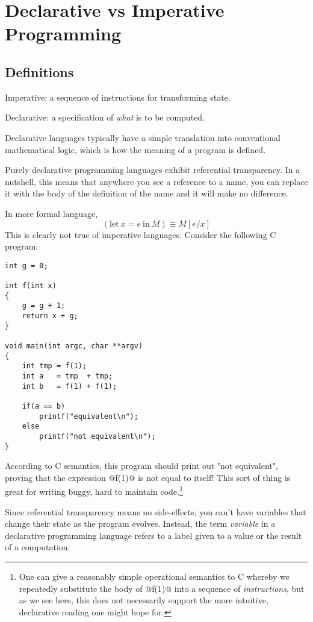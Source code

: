 \section{Declarative vs Imperative Programming}

\subsection{Definitions}

\begin{description}
\item{Imperative:} a sequence of instructions for transforming state.
\item{Declarative:} a specification of \emph{what} is to be computed.
\end{description}

Declarative languages typically have a simple translation into
conventional mathematical logic, which is how the meaning of a program
is defined.

Purely declarative programming languages exhibit referential
transparency.  In a nutshell, this means that anywhere you see a
reference to a name, you can replace it with the body of the
definition of the name and it will make no difference.

In more formal language,
\[
(\text{let}\ x = e\ \text{in}\ M)  \equiv  M[e/x]
\]
This is clearly not true of imperative languages.  Consider
the following C program:

\begin{verbatim}
int g = 0;

int f(int x)
{
    g = g + 1;
    return x + g;
}

void main(int argc, char **argv)
{
    int tmp = f(1);
    int a   = tmp  + tmp;
    int b   = f(1) + f(1);

    if(a == b)
        printf("equivalent\n");
    else
        printf("not equivalent\n");
}
\end{verbatim}

According to C semantics, this program should print out "not
equivalent", proving that the expression @f(1)@ is not equal to
itself!  This sort of thing is great for writing buggy, hard to
maintain code.\footnote{One can give a reasonably simple
operational semantics to C whereby we repeatedly substitute the
body of @f(1)@ into a sequence of \emph{instructions}, but as we
see here, this does not necessarily support the more intuitive,
declarative reading one might hope for.}

Since referential transparency means no side-effects, you can't have
variables that change their state as the program evolves.  Instead, the
term \emph{variable} in a declarative programming language refers to a
label given to a value or the result of a computation.

